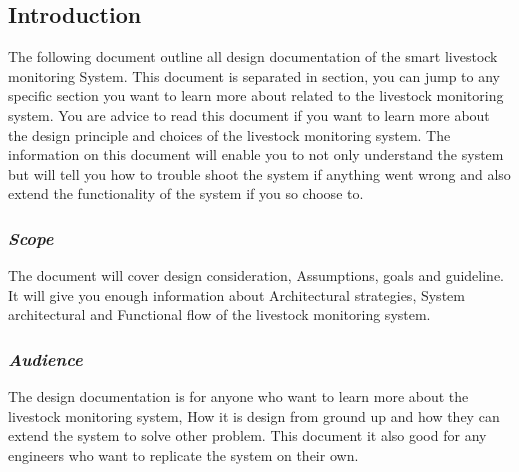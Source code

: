 \subsection{Introduction}

The following document outline all design documentation of the smart livestock monitoring
System. This document is separated in section, you can jump to any specific section you want to learn more
about related to the livestock monitoring system. You are advice to read this document if you want to
learn more about the design principle and choices of the livestock monitoring system. The information on this document will
enable you to not only understand the system but will tell you how to trouble shoot the system if anything went
wrong and also extend the functionality of the system if you so choose to.

\subsubsection{\textit{Scope}}
The document will cover design consideration, Assumptions, goals and guideline. It will give you enough information
about Architectural strategies, System architectural and Functional flow of the livestock monitoring system.

\subsubsection{\textit{Audience}}
The design documentation is for anyone who want to learn more about the livestock monitoring system,
How it is design from ground up and how they can extend the system to solve other problem. This document it also
good for any engineers who want to replicate the system on their own.

